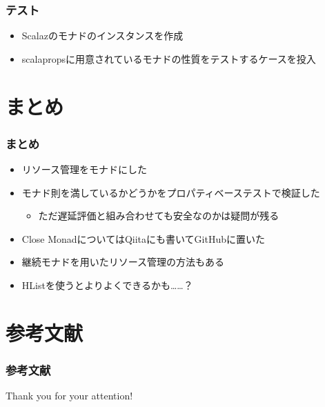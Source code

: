 \begin{frame}
  \frametitle{テスト}

  

  \begin{itemize}
    \item<2-> Scalazのモナドのインスタンスを作成
    \item<3-> scalapropsに用意されているモナドの性質をテストするケースを投入
  \end{itemize}
\end{frame}

\section{まとめ}

\begin{frame}
  \frametitle{まとめ}

  \begin{itemize}
    \item<2-> リソース管理をモナドにした
    \item<3-> モナド則を満しているかどうかをプロパティベーステストで検証した
    \begin{itemize}
      \item<4-> ただ遅延評価と組み合わせても安全なのかは疑問が残る
    \end{itemize}
    \item<5-> Close MonadについてはQiitaにも書いてGitHubに置いた\cite{closemonad,closemonadgithub}
    \item<6-> 継続モナドを用いたリソース管理の方法もある\cite{tanakh2015}
    \item<7-> HList\cite{Kiselyov2004,hlist}を使うとよりよくできるかも……？
  \end{itemize}
\end{frame}

\section*{参考文献}
\begin{frame}[allowframebreaks]
  \frametitle{参考文献}

  
  \nocite{*}

  
\end{frame}

\begin{frame}
  \centering
  {\Huge Thank you for your attention!}
\end{frame}


